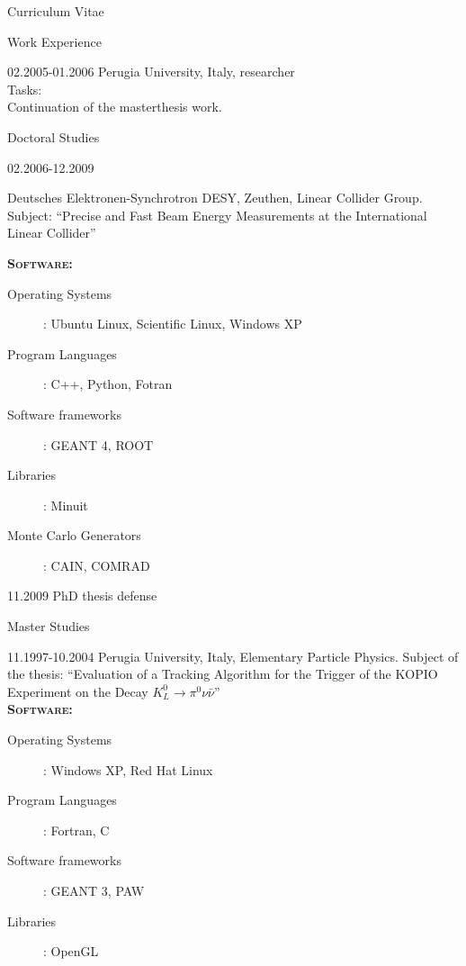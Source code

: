 \documentclass[11pt,a4paper]{scrartcl}
\begin{document}
\begin{cv}{Curriculum Vitae}
\begin{cvlist}{Work Experience}
\vspace{\baselineskip}

\item[02.2005-01.2006] Perugia
University, Italy, researcher \\

Tasks:\\

Continuation of the masterthesis work.

\end{cvlist}

\begin{cvlist}{Doctoral Studies}
\item[02.2006-12.2009]

Deutsches Elektronen-Synchrotron DESY, Zeuthen, Linear Collider
Group.\\ Subject:
"`Precise and Fast Beam Energy Measurements at the International
Linear Collider"'

{\scshape {\bfseries Software:}}
\begin{description}
\item[Operating Systems] : Ubuntu Linux, Scientific Linux, Windows XP
\item[Program Languages] : C++, Python, Fotran
\item[Software frameworks] : GEANT 4, ROOT
\item[Libraries] : Minuit
\item[Monte Carlo Generators] : CAIN, COMRAD
\end{description}

\item[11.2009] PhD thesis defense

\end{cvlist}

\begin{cvlist}{Master Studies}
\item [11.1997-10.2004]Perugia University, Italy, Elementary Particle Physics.
Subject of the thesis:
"`Evaluation of a Tracking Algorithm for the Trigger of the KOPIO Experiment on the Decay
$K_L^0\rightarrow\pi^0\nu\bar{\nu}$"'\\

{\scshape {\bfseries Software:}}
\begin{description}
\item[Operating Systems] : Windows XP, Red Hat Linux
\item[Program Languages] : Fortran, C
\item[Software frameworks] : GEANT 3, PAW
\item[Libraries] : OpenGL
\end{description}
\end{cvlist}


\end{cv}
\end{document}
